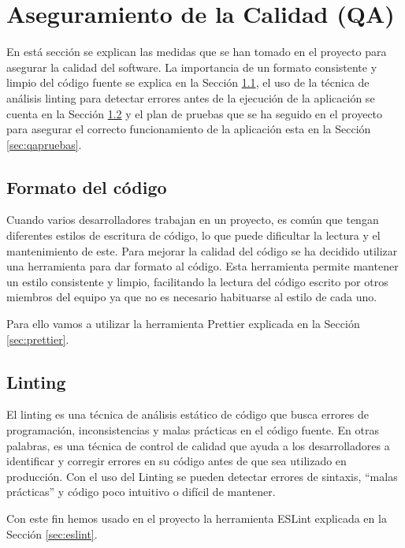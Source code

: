 \section{Aseguramiento de la Calidad (QA)}\label{sec:qa}
En está sección se explican las medidas que se han tomado en el proyecto para asegurar la calidad del software. La importancia de un formato consistente y limpio del código fuente se explica en la Sección \ref{sec:qaformato}, el uso de la técnica de análisis linting para detectar errores antes de la ejecución de la aplicación se cuenta en la Sección \ref{sec:qalinting} y el plan de pruebas que se ha seguido en el proyecto para asegurar el correcto funcionamiento de la aplicación esta en la Sección \ref{sec:qapruebas}.

\subsection{Formato del código}\label{sec:qaformato}
Cuando varios desarrolladores trabajan en un proyecto, es común que tengan diferentes estilos de escritura de código, lo que puede dificultar la lectura y el mantenimiento de este. Para mejorar la calidad del código se ha decidido utilizar una herramienta para dar formato al código. Esta herramienta permite mantener un estilo consistente y limpio, facilitando la lectura del código escrito por otros miembros del equipo ya que no es necesario habituarse al estilo de cada uno.

Para ello vamos a utilizar la herramienta Prettier explicada en la Sección \ref{sec:prettier}.

\subsection{Linting}\label{sec:qalinting}
El linting es una técnica de análisis estático de código que busca errores de programación, inconsistencias y malas prácticas en el código fuente. En otras palabras, es una técnica de control de calidad que ayuda a los desarrolladores a identificar y corregir errores en su código antes de que sea utilizado en producción. Con el uso del Linting se pueden detectar errores de sintaxis, ``malas prácticas'' y código poco intuitivo o difícil de mantener.

Con este fin hemos usado en el proyecto la herramienta ESLint explicada en la Sección \ref{sec:eslint}.

